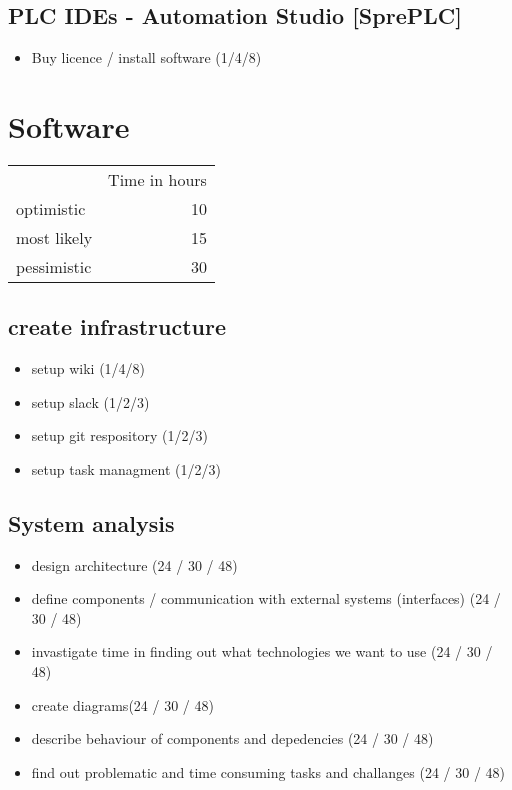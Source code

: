 \documentclass
[
 12pt, %
       DIV12,
       a4paper, %
       oneside, %
       titlepage, %
       parskip=half, %
       headings=normal, %
       listof=totoc, %
       bibliography=totoc, %
       index=totoc, %
       captions=tableheading, %
       ]{scrreprt}
\begin{document}
\section{PLC IDEs - Automation Studio [SprePLC]}
\label{sec:org003d4a8}
\begin{itemize}
\item Buy licence / install software (1/4/8)
\end{itemize}

\chapter{Software}
\label{sec:orgdf36b5c}

\begin{center}
\begin{tabular}{lr}
 & Time in hours\\
optimistic & 10\\
most likely & 15\\
pessimistic & 30\\
\end{tabular}
\end{center}
\section{create infrastructure}
\label{sec:org06c00a2}
\begin{itemize}
\item setup wiki (1/4/8)
\item setup slack (1/2/3)
\item setup git respository (1/2/3)
\item setup task managment (1/2/3)
\end{itemize}
\section{System analysis}
\label{sec:org498acda}
\begin{itemize}
\item design architecture (24 / 30 / 48)
\item define components / communication with external systems (interfaces) (24 / 30 / 48)
\item invastigate time in finding out what technologies we want to use (24 / 30 / 48)
\item create diagrams(24 / 30 / 48)
\item describe behaviour of components and depedencies (24 / 30 / 48)
\item find out problematic and time consuming tasks and challanges (24 / 30 / 48)
\end{itemize}
\end{document}
